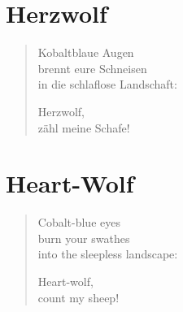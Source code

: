 
\cleartoverso

\section{Herzwolf}

\begin{verse}
Kobaltblaue Augen\\
brennt eure Schneisen\\
in die schlaflose Landschaft:

Herzwolf,\\
zähl meine Schafe!
\end{verse}

\cleartorecto

\section{Heart-Wolf}

\begin{verse}
Cobalt-blue eyes\\
burn your swathes\\
into the sleepless landscape:

Heart-wolf,\\
count my sheep!
\end{verse}

